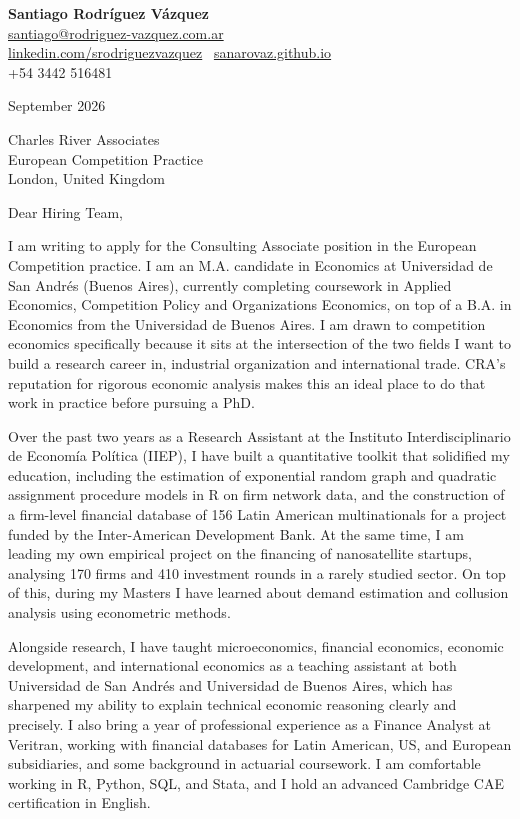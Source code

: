 \documentclass[11pt]{article}
\begin{document}
\begin{flushright}
\textbf{Santiago Rodríguez Vázquez}\\
\href{mailto:santiago@rodriguez-vazquez.com.ar}{santiago@rodriguez-vazquez.com.ar}\\
\href{https://www.linkedin.com/in/srodriguezvazquez/?locale=en-US}{linkedin.com/srodriguezvazquez} \textbar\ \href{https://sanarovaz.github.io}{sanarovaz.github.io}\\
+54 3442 516481
\end{flushright}

\bigskip

September 2026

\bigskip

Charles River Associates \\
European Competition Practice \\
London, United Kingdom

\bigskip

Dear Hiring Team,

I am writing to apply for the Consulting Associate position in the European Competition practice. I am an M.A. candidate in Economics at Universidad de San Andrés (Buenos Aires), currently completing coursework in Applied Economics, Competition Policy and Organizations Economics, on top of a B.A. in Economics from the Universidad de Buenos Aires. I am drawn to competition economics specifically because it sits at the intersection of the two fields I want to build a research career in, industrial organization and international trade. CRA's reputation for rigorous economic analysis makes this an ideal place to do that work in practice before pursuing a PhD.

Over the past two years as a Research Assistant at the Instituto Interdisciplinario de Economía Política (IIEP), I have built a quantitative toolkit that solidified my education, including the estimation of exponential random graph and quadratic assignment procedure models in R on firm network data, and the construction of a firm-level financial database of 156 Latin American multinationals for a project funded by the Inter-American Development Bank. At the same time, I am leading my own empirical project on the financing of nanosatellite startups, analysing 170 firms and 410 investment rounds in a rarely studied sector. On top of this, during my Masters I have learned about demand estimation and collusion analysis using econometric methods.

Alongside research, I have taught microeconomics, financial economics, economic development, and international economics as a teaching assistant at both Universidad de San Andrés and Universidad de Buenos Aires, which has sharpened my ability to explain technical economic reasoning clearly and precisely. I also bring a year of professional experience as a Finance Analyst at Veritran, working with financial databases for Latin American, US, and European subsidiaries, and some background in actuarial coursework. I am comfortable working in R, Python, SQL, and Stata, and I hold an advanced Cambridge CAE certification in English.
\end{document}
